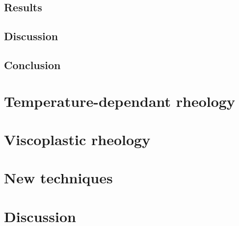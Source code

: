 \documentclass[a4paper,11pt,oneside]{book}
\begin{document}
\subsection{Results}

\subsection{Discussion}

\subsection{Conclusion}

\section{Temperature-dependant rheology}

\section{Viscoplastic rheology}

\section{New techniques}

\section{Discussion}
\end{document}
